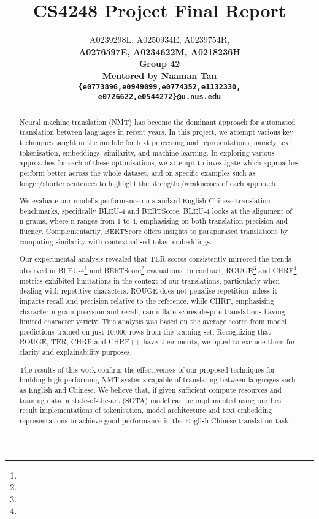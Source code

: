 \documentclass[11pt]{article}
\title{CS4248 Project Final Report}
\author{A0239298L, A0250934E, A0239754R, \\ \bf A0276597E, A0234622M, A0218236H \\
  Group 42 \\
  Mentored by Naaman Tan \\
  \texttt{\{e0773896,e0949099,e0774352,e1132330,}\\
  \texttt{e0726622,e0544272\}@u.nus.edu}}
\begin{document}
 
\maketitle 

\begin{abstract}

Neural machine translation (NMT) has become the dominant approach for automated
translation between languages in recent years. In this project, we attempt
various key techniques taught in the module for text processing and
representations, namely text tokenisation, embeddings, similarity, and machine
learning. In exploring various approaches for each of these optimisations, we
attempt to investigate which approaches perform better across the whole
dataset, and on specific examples such as longer/shorter sentences to highlight
the strengths/weaknesses of each approach.

We evaluate our model’s performance on standard English-Chinese translation
benchmarks, specifically BLEU-4 and BERTScore. BLEU-4 looks at the alignment of
n-grams, where n ranges from 1 to 4, emphasising on both translation precision
and fluency. Complementarily, BERTScore offers insights to paraphrased
translations by computing similarity with contextualised token embeddings. 

Our experimental analysis revealed that TER scores consistently mirrored the
trends observed in BLEU-4\footnote[1]{

}
and BERTScore\footnote[2]{
    
} evaluations. In contrast, ROUGE\footnote[3]{

} and
CHRF\footnote[4]{

} metrics exhibited limitations in the context of our translations,
particularly when dealing with repetitive characters. ROUGE does not penalise
repetition unless it impacts recall and precision relative to the reference,
while CHRF, emphasising character n-gram precision and recall, can inflate
scores despite translations having limited character variety. This analysis was
based on the average scores from model predictions trained on just 10,000 rows
from the training set. Recognizing that ROUGE, TER, CHRF and CHRF++ have their
merits, we opted to exclude them for clarity and explainability purposes. 

The results of this work confirm the effectiveness of our proposed techniques
for building high-performing NMT systems capable of translating between
languages such as English and Chinese. We believe that, if given sufficient
compute resources and training data, a state-of-the-art (SOTA) model can be
implemented using our best result implementations of tokenisation, model
architecture and text embedding representations to achieve good performance in
the English-Chinese translation task.
    
\end{abstract}
\end{document}
